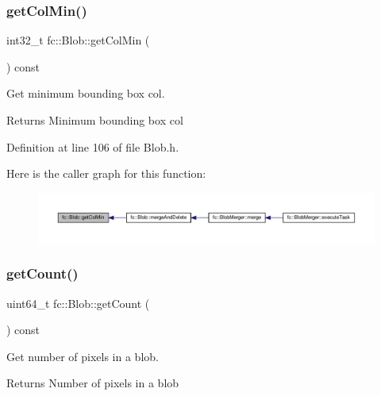 \subsubsection{\texorpdfstring{get\+Col\+Min()}{getColMin()}}
{\footnotesize\ttfamily int32\+\_\+t fc\+::\+Blob\+::get\+Col\+Min (\begin{DoxyParamCaption}{ }\end{DoxyParamCaption}) const\hspace{0.3cm}{\ttfamily [inline]}}



Get minimum bounding box col. 

\begin{DoxyReturn}{Returns}
Minimum bounding box col 
\end{DoxyReturn}


Definition at line 106 of file Blob.\+h.

Here is the caller graph for this function\+:
\nopagebreak
\begin{figure}[H]
\begin{center}
\leavevmode
\includegraphics[width=350pt]{d2/d7e/classfc_1_1Blob_ac4e8548eb6f47c1febbd70184bee315a_icgraph}
\end{center}
\end{figure}
\mbox{\label{classfc_1_1Blob_a7443f8362ad88c61e5dcfae2dad54d47}} 
\subsubsection{\texorpdfstring{get\+Count()}{getCount()}}
{\footnotesize\ttfamily uint64\+\_\+t fc\+::\+Blob\+::get\+Count (\begin{DoxyParamCaption}{ }\end{DoxyParamCaption}) const\hspace{0.3cm}{\ttfamily [inline]}}



Get number of pixels in a blob. 

\begin{DoxyReturn}{Returns}
Number of pixels in a blob 
\end{DoxyReturn}


